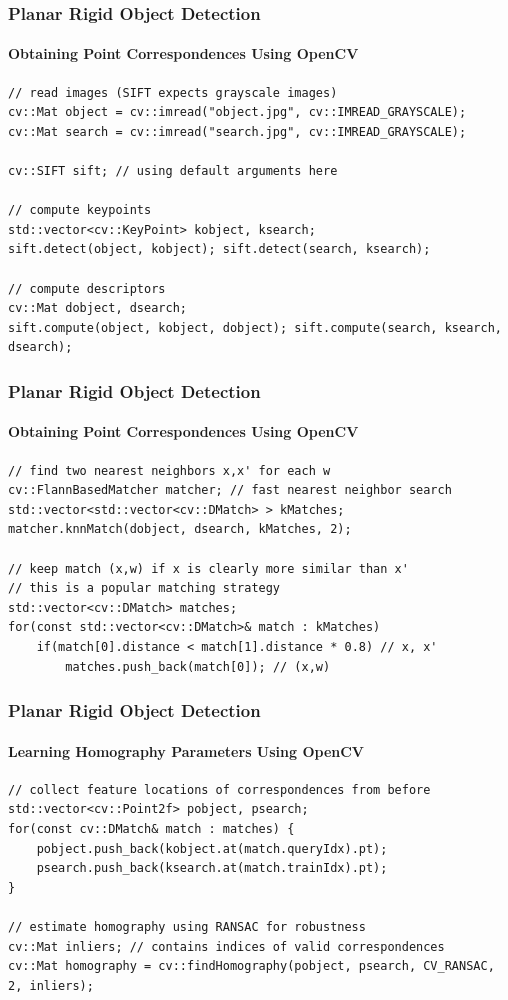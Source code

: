 \documentclass[xetex,professionalfont]{beamer}
\begin{document}

\begin{frame}[fragile]
\frametitle{Planar Rigid Object Detection}
\framesubtitle{Obtaining Point Correspondences Using OpenCV}

\footnotesize
\begin{verbatim}
// read images (SIFT expects grayscale images)
cv::Mat object = cv::imread("object.jpg", cv::IMREAD_GRAYSCALE);
cv::Mat search = cv::imread("search.jpg", cv::IMREAD_GRAYSCALE);

cv::SIFT sift; // using default arguments here

// compute keypoints
std::vector<cv::KeyPoint> kobject, ksearch;
sift.detect(object, kobject); sift.detect(search, ksearch);

// compute descriptors
cv::Mat dobject, dsearch;
sift.compute(object, kobject, dobject); sift.compute(search, ksearch, dsearch);
\end{verbatim}

\end{frame}


\begin{frame}[fragile]
\frametitle{Planar Rigid Object Detection}
\framesubtitle{Obtaining Point Correspondences Using OpenCV}

\footnotesize
\begin{verbatim}
// find two nearest neighbors x,x' for each w
cv::FlannBasedMatcher matcher; // fast nearest neighbor search
std::vector<std::vector<cv::DMatch> > kMatches;
matcher.knnMatch(dobject, dsearch, kMatches, 2);

// keep match (x,w) if x is clearly more similar than x'
// this is a popular matching strategy
std::vector<cv::DMatch> matches;
for(const std::vector<cv::DMatch>& match : kMatches)
    if(match[0].distance < match[1].distance * 0.8) // x, x'
        matches.push_back(match[0]); // (x,w)
\end{verbatim}

\end{frame}


\begin{frame}[fragile]
\frametitle{Planar Rigid Object Detection}
\framesubtitle{Learning Homography Parameters Using OpenCV}

\footnotesize
\begin{verbatim}
// collect feature locations of correspondences from before
std::vector<cv::Point2f> pobject, psearch;
for(const cv::DMatch& match : matches) { 
    pobject.push_back(kobject.at(match.queryIdx).pt);
    psearch.push_back(ksearch.at(match.trainIdx).pt);
}

// estimate homography using RANSAC for robustness
cv::Mat inliers; // contains indices of valid correspondences
cv::Mat homography = cv::findHomography(pobject, psearch, CV_RANSAC, 2, inliers);
\end{verbatim}

\end{frame}
\end{document}
